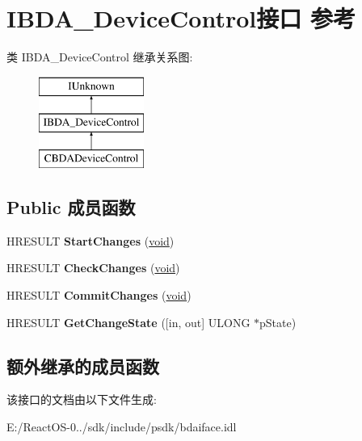 \hypertarget{interface_i_b_d_a___device_control}{}\section{I\+B\+D\+A\+\_\+\+Device\+Control接口 参考}
\label{interface_i_b_d_a___device_control}
类 I\+B\+D\+A\+\_\+\+Device\+Control 继承关系图\+:\begin{figure}[H]
\begin{center}
\leavevmode
\includegraphics[height=3.000000cm]{interface_i_b_d_a___device_control}
\end{center}
\end{figure}
\subsection*{Public 成员函数}
\begin{DoxyCompactItemize}
\item 
\mbox{\label{interface_i_b_d_a___device_control_ab3d80ff88d8a63e282b9eb0f7a5f25f8}} 
H\+R\+E\+S\+U\+LT {\bfseries Start\+Changes} (\hyperlink{interfacevoid}{void})
\item 
\mbox{\label{interface_i_b_d_a___device_control_a082cd93545a3dfe7a9ec303c701ff62f}} 
H\+R\+E\+S\+U\+LT {\bfseries Check\+Changes} (\hyperlink{interfacevoid}{void})
\item 
\mbox{\label{interface_i_b_d_a___device_control_a847f187ee4d8210591ff35fb5c80b09c}} 
H\+R\+E\+S\+U\+LT {\bfseries Commit\+Changes} (\hyperlink{interfacevoid}{void})
\item 
\mbox{\label{interface_i_b_d_a___device_control_af572653087f554f360969a986eb4a144}} 
H\+R\+E\+S\+U\+LT {\bfseries Get\+Change\+State} (\mbox{[}in, out\mbox{]} U\+L\+O\+NG $\ast$p\+State)
\end{DoxyCompactItemize}
\subsection*{额外继承的成员函数}


该接口的文档由以下文件生成\+:\begin{DoxyCompactItemize}
\item 
E\+:/\+React\+O\+S-\/0../sdk/include/psdk/bdaiface.\+idl\end{DoxyCompactItemize}
